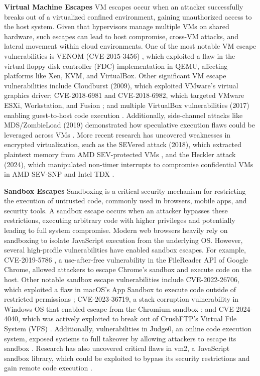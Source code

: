 \noindent\textbf{Virtual Machine Escapes} VM escapes occur when an attacker successfully breaks out of a virtualized confined environment, gaining unauthorized access to the host system. Given that hypervisors manage multiple VMs on shared hardware, such escapes can lead to host compromise, cross-VM attacks, and lateral movement within cloud environments. One of the most notable VM escape vulnerabilities is VENOM (CVE-2015-3456) \cite{abdoul2018novel}, which exploited a flaw in the virtual floppy disk controller (FDC) implementation in QEMU, affecting platforms like Xen, KVM, and VirtualBox. Other significant VM escape vulnerabilities include Cloudburst (2009), which exploited VMware's virtual graphics driver; CVE-2018-6981 and CVE-2018-6982, which targeted VMware ESXi, Workstation, and Fusion \cite{vmware2018escape}; and multiple VirtualBox vulnerabilities (2017) enabling guest-to-host code execution \cite{virtualbox2017bugs}. Additionally, side-channel attacks like MDS/ZombieLoad (2019) demonstrated how speculative execution flaws could be leveraged across VMs \cite{mds2019attack}. More recent research has uncovered weaknesses in encrypted virtualization, such as the SEVered attack (2018), which extracted plaintext memory from AMD SEV-protected VMs \cite{severed2018}, and the Heckler attack (2024), which manipulated non-timer interrupts to compromise confidential VMs in AMD SEV-SNP and Intel TDX \cite{heckler2024}.

\noindent\textbf{Sandbox Escapes} Sandboxing is a critical security mechanism for restricting the execution of untrusted code, commonly used in browsers, mobile apps, and security tools. A sandbox escape occurs when an attacker bypasses these restrictions, executing arbitrary code with higher privileges and potentially leading to full system compromise. Modern web browsers heavily rely on sandboxing to isolate JavaScript execution from the underlying OS. However, several high-profile vulnerabilities have enabled sandbox escapes. For example, CVE-2019-5786 \cite{chromezeroday}, a use-after-free vulnerability in the FileReader API of Google Chrome, allowed attackers to escape Chrome's sandbox and execute code on the host. Other notable sandbox escape vulnerabilities include CVE-2022-26706, which exploited a flaw in macOS's App Sandbox to execute code outside of restricted permissions \cite{macossandboxescape}; CVE-2023-36719, a stack corruption vulnerability in Windows OS that enabled escape from the Chromium sandbox \cite{chromiumsandboxescape}; and CVE-2024-4040, which was actively exploited to break out of CrushFTP’s Virtual File System (VFS) \cite{crushftpsandboxescape}. Additionally, vulnerabilities in Judge0, an online code execution system, exposed systems to full takeover by allowing attackers to escape its sandbox \cite{judge0sandboxescape}. Research has also uncovered critical flaws in vm2, a JavaScript sandbox library, which could be exploited to bypass its security restrictions and gain remote code execution \cite{vm2sandboxescape}.